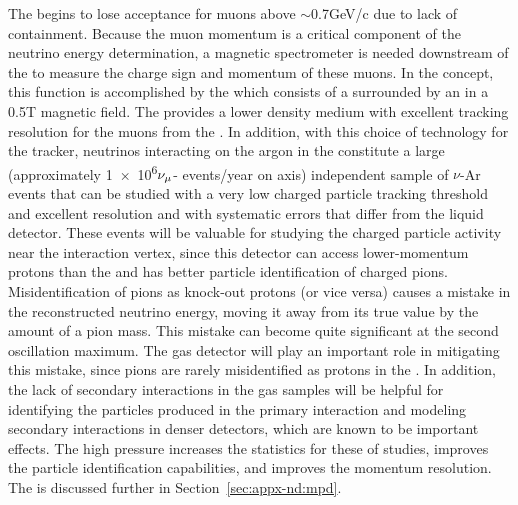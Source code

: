 The  begins to lose acceptance for muons above $\sim$\num{0.7}{GeV/c} due to lack of containment. Because the muon momentum is a critical component of the neutrino energy determination, a magnetic spectrometer is needed downstream of the  to measure the charge sign and momentum of these muons. In the   concept, this function is accomplished by the  which consists of a  surrounded by an  in a \num{0.5}{T} magnetic field. The  provides a lower density medium with excellent tracking resolution for the muons from the . In addition, with this choice of technology for the tracker, neutrinos interacting on the argon in the  constitute a large (approximately \num{1e6}$\nu_\mu$- events/year on axis) independent sample of $\nu$-Ar events that can be studied with a very low charged particle tracking threshold and excellent resolution and with systematic errors that differ from the liquid detector. These events will be valuable for studying the charged particle activity near the interaction vertex, since this detector can access lower-momentum protons than the  and has better particle identification of charged pions.  Misidentification of pions as knock-out protons (or vice versa) causes a mistake in the reconstructed neutrino energy, moving it away from its true value by the amount of a pion mass.  This mistake can become quite significant at the second oscillation maximum. The gas detector will play an important role in mitigating this mistake, since pions are rarely misidentified as protons in the .  In addition, the lack of secondary interactions in the gas samples will be helpful for identifying the particles produced in the primary interaction and modeling secondary interactions in denser detectors, which are known to be important effects\cite{Friedland:2018vry}. The high pressure increases the statistics for these of studies, improves the particle identification capabilities, and improves the momentum resolution. 
The  is discussed further in Section~\ref{sec:appx-nd:mpd}.



